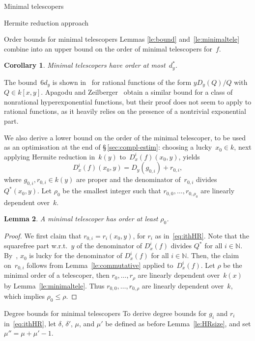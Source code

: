 \documentclass{sig-alt-full}
\newcommand{\bN}{\mathbb{N}}
\newtheorem{lemma}{Lemma}
\newtheorem{cor}[lemma]{Corollary}
\begin{document}
\begin{section}{Minimal telescopers}
\begin{subsection}{Hermite reduction approach}
\begin{subsubsection}{Order bounds for minimal telescopers}\label{se:lowerbound}
Lemmas \ref{le:bound} and~\ref{le:minimaltele} combine into an upper bound
on the order of minimal telescopers for~$f$.
\begin{cor}\label{cor:upperbound}
Minimal telescopers have order at most~$d_y^*$.
\end{cor}
The bound~$6d_y$ is shown in~\cite{BCLSS2007}
for rational functions of the form $yD_y(Q)/Q$ with $Q\in k[x, y]$.
Apagodu and Zeilberger~\cite{Apagodu2006} obtain a similar bound for a
class of nonrational hyperexponential functions, but their proof does
not seem to apply to rational functions, as it heavily relies on the
presence of a nontrivial exponential part.

We also derive a lower bound on the order of the minimal telescoper,
to be used as an optimisation at the end of \S\,\ref{sec:compl-estim}:
choosing a lucky~$x_0\in k$,
next applying Hermite reduction in~$k(y)$ to~$D_x^i(f)(x_0, y)$, yields
\begin{equation}\label{eq:ithUHR}
D_x^i (f)(x_0, y) = D_y (g_{0, i}) + r_{0, i},
\end{equation}
where $g_{0, i}, r_{0, i}\in k(y)$ are proper and the denominator
of~$r_{0, i}$ divides~$Q^*(x_0, y)$.
Let $\rho_0$ be the smallest integer such that $r_{0, 0}, \dots, r_{0,
\rho_0}$ are linearly dependent over~$k$.
\begin{lemma}\label{le:lowerbound}
A minimal telescoper has order at least $\rho_0$.
\end{lemma}
\begin{proof}
We first claim that $r_{0, i}=r_i(x_0, y)$, for $r_i$ as
in~\eqref{eq:ithHR}. Note that the squarefree part w.r.t.~$y$ of the
denominator of $D_x^i(f)$ divides $Q^*$ for all $i\in\bN$.
By~\cite[Cor.~5.5]{Gerhard2004}, $x_0$ is lucky for the
denominator of $D_x^i(f)$ for all $i\in \bN$.
Then, the claim on~$r_{0,i}$ follows from Lemma~\ref{le:commutative}
applied to~$D_x^i(f)$.
Let $\rho$ be the
minimal order of a telescoper, then $r_0, \dots, r_{\rho}$ are
linearly dependent over~$k(x)$ by Lemma~\ref{le:minimaltele}. Thus
$r_{0, 0}, \dots, r_{0, \rho}$ are linearly dependent over~$k$,
which implies $\rho_0\le \rho$.
\end{proof}
\end{subsubsection}

\begin{subsubsection}{Degree bounds for minimal telescopers}
To derive degree bounds for $g_i$ and $r_i$
in~\eqref{eq:ithHR},
let $\delta$, $\delta'$, $\mu$, and $\mu'$ be defined
as before Lemma~\ref{le:HRsize},
and set $\mu'' = \mu + \mu' - 1$.


\end{subsubsection}
\end{subsection}
\end{section}
\end{document}
